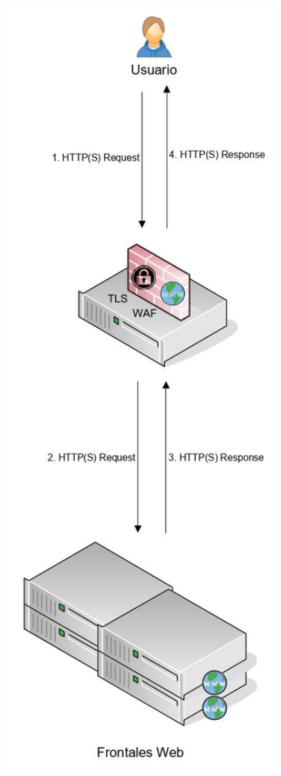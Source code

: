 \begin{enumerate}
\begin{itemize}
\begin{center}
          \includegraphics[width=0.8\textwidth]{fig/UseCase1}
        \end{center}
    \end{itemize}
\end{enumerate}


